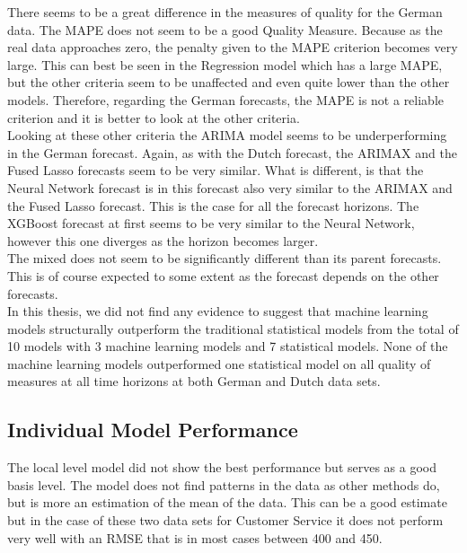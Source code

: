 There seems to be a great difference in the measures of quality for the German data. The MAPE does not seem to be a good Quality Measure. Because as the real data approaches zero, the penalty given to the MAPE criterion becomes very large. This can best be seen in the Regression model which has a large MAPE, but the other criteria seem to be unaffected and even quite lower than the other models. Therefore, regarding the German forecasts, the MAPE is not a reliable criterion and it is better to look at the other criteria.\\

Looking at these other criteria the ARIMA model seems to be underperforming in the German forecast. Again, as with the Dutch forecast, the ARIMAX and the Fused Lasso forecasts seem to be very similar. What is different, is that the Neural Network forecast is in this forecast also very similar to the ARIMAX and the Fused Lasso forecast. This is the case for all the forecast horizons. The XGBoost forecast at first seems to be very similar to the Neural Network, however this one diverges as the horizon becomes larger.\\

The mixed does not seem to be significantly different than its parent forecasts. This is of course expected to some extent as the forecast depends on the other forecasts.\\

In this thesis, we did not find any evidence to suggest that machine learning models structurally outperform the traditional statistical models from the total of 10 models with 3 machine learning models and 7 statistical models. None of the machine learning models outperformed one statistical model on all quality of measures at all time horizons at both German and Dutch data sets.\\

\subsection{Individual Model Performance}
The local level model did not show the best performance but serves as a good basis level. The model does not find patterns in the data as other methods do, but is more an estimation of the mean of the data. This can be a good estimate but in the case of these two data sets for Customer Service it does not perform very well with an RMSE that is in most cases between 400 and 450.\\

